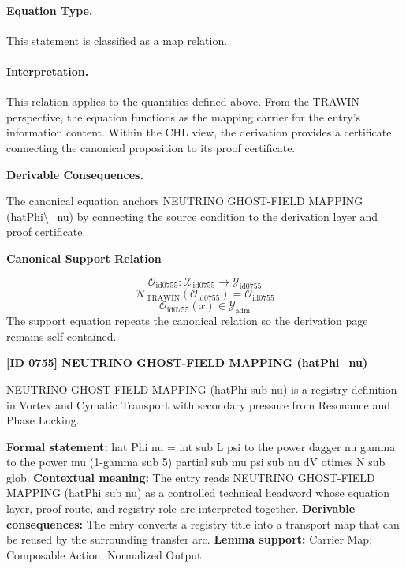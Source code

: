 \paragraph{Equation Type.}
This statement is classified as a map relation.

\paragraph{Interpretation.}
This relation applies to the quantities defined above. From the TRAWIN perspective, the equation functions as the mapping carrier for the entry’s information content. Within the CHL view, the derivation provides a certificate connecting the canonical proposition to its proof certificate.

\par\vspace{0.35em}
\noindent\textbf{Derivable Consequences.}\quad
\begingroup
\footnotesize
\raggedright
The canonical equation anchors NEUTRINO GHOST-FIELD MAPPING (hatPhi\textbackslash{}\_nu) by connecting the source condition to the derivation layer and proof certificate.
\par\endgroup

\noindent\textbf{Canonical Support Relation}\par
\[
\mathcal{O}_{\mathrm{id0755}}:\mathcal{X}_{\mathrm{id0755}}\longrightarrow\mathcal{Y}_{\mathrm{id0755}}
\]
\[
\mathcal{N}_{\mathrm{TRAWIN}}(\mathcal{O}_{\mathrm{id0755}})=\mathcal{O}_{\mathrm{id0755}}
\]
\[
\mathcal{O}_{\mathrm{id0755}}(x)\in\mathcal{Y}_{\mathrm{adm}}
\]
\noindent The support equation repeats the canonical relation so the derivation page remains self-contained.\par

\clearpage
\noindent\textbf{[ID 0755] NEUTRINO GHOST-FIELD MAPPING (hatPhi\_nu)}\par
\vspace{0.35em}
\begingroup\small
{}
NEUTRINO GHOST-FIELD MAPPING (hatPhi sub nu) is a registry definition in Vortex and Cymatic Transport with secondary pressure from Resonance and Phase Locking.

\begingroup\footnotesize\setlength{\emergencystretch}{3em}\sloppy
\textbf{Formal statement:} hat Phi nu = int sub L psi to the power dagger nu gamma to the power mu (1-gamma sub 5) partial sub mu psi sub nu dV otimes N sub glob. \textbf{Contextual meaning:} The entry reads NEUTRINO GHOST-FIELD MAPPING (hatPhi sub nu) as a controlled technical headword whose equation layer, proof route, and registry role are interpreted together. \textbf{Derivable consequences:} The entry converts a registry title into a transport map that can be reused by the surrounding transfer arc. \textbf{Lemma support:} Carrier Map; Composable Action; Normalized Output.\par
\endgroup

